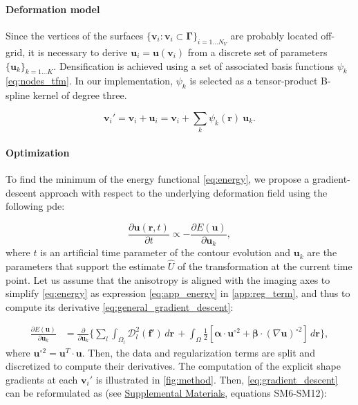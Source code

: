 \documentclass[3p,authoryear,fleqn]{elsarticle}
\providecommand{\mdist}[2]{ \mathcal{D}_{#2}^2(\mathbf{#1}) }
\providecommand{\gammaset}{\ensuremath{\boldsymbol{\Gamma}}}
\renewcommand{\vec}[1]{\mathbf{#1}}
\providecommand{\suppl}[1]{\href{http://figshare.com/s/459c26b4ee8211e493b306ec4bbcf141}{Supplemental Materials}, #1}
\begin{document}
\paragraph*{Deformation model}\label{sec:deformation_model}
Since the vertices of the surfaces $\{\vec{v}_i: \vec{v}_i \subset \gammaset \}_{i=1 \ldots N_V}$
  are probably located off-grid, it is necessary to derive $\vec{u}_i = \vec{u}(\vec{v}_i)$ from a discrete set of parameters
  $\{\vec{u}_k\}_{k=1 \ldots K}$.
Densification is achieved using a set of associated basis functions $\psi_k$ \eqref{eq:nodes_tfm}.
In our implementation, $\psi_k$ is selected as a tensor-product B-spline kernel
  of degree three.

  \begin{equation}
  \vec{v}_i' = \vec{v}_i + \vec{u}_i = \vec{v}_i + \sum_k \psi_k(\vec{r}) \: \vec{u}_k.
  \label{eq:nodes_tfm}
  \end{equation}


\paragraph*{Optimization}
\label{sec:gradient_descent}
To find the minimum of the energy functional \eqref{eq:energy},
  we propose a gradient-descent approach with respect to the underlying
  deformation field using the following \gls*{pde}:

  \begin{equation}
  \frac{\partial \vec{u}(\vec{r},t)}{\partial t} \propto - \frac{\partial E(\vec{u})}{\partial \vec{u}_k},
  \label{eq:general_gradient_descent}
  \end{equation}
  where $t$ is an artificial time parameter of the contour
  evolution and $\vec{u}_k$ are the parameters that support the estimate
  $\hat{U}$ of the transformation at the current time point.
Let us assume that the anisotropy is aligned with the imaging axes to simplify
  \eqref{eq:energy} as expression \eqref{eq:app_energy} in \ref{app:reg_term},
  and thus to compute its derivative \eqref{eq:general_gradient_descent}:

  \begin{align}
  \frac{\partial E(\vec{u})}{\partial \vec{u}_k} &=
  \frac{ \partial }{\partial \vec{u}_k} \Big\{
  \underset{l}{\sum} \int_{\Omega_l} \mdist{f'}{l} \,d\vec{r} \, +   \int_{\Omega} \frac12 [ \boldsymbol{\alpha} \cdot \vec{u}^{\circ2}
  + \boldsymbol{\beta} \cdot (\nabla \vec{u})^{\circ2} ] \,d\vec{r}
  \Big\},
  \label{eq:gradient_descent}
  \end{align}
  where $\vec{u}^{\circ2} = \vec{u}^T \cdot \vec{u}$.
Then, the data and regularization terms are split and discretized to compute their
  derivatives.
The computation of the explicit shape gradients at each $\vec{v}_i'$ is illustrated in \autoref{fig:method}.
Then, \eqref{eq:gradient_descent} can be reformulated as (see \suppl{equations SM6-SM12}):
\end{document}
